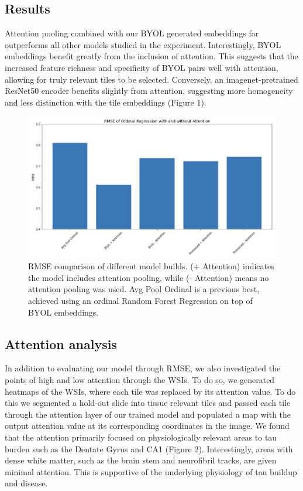 \documentclass{article} %
\begin{document}
\subsection{Results}

Attention pooling combined with our BYOL generated embeddings far outperforms all other models studied in the experiment. Interestingly, BYOL embeddings benefit greatly from the inclusion of attention. This suggests that the increased feature richness and specificity of BYOL pairs well with attention, allowing for truly relevant tiles to be selected. Conversely, an imagenet-pretrained ResNet50 encoder benefits slightly from attention, suggesting more homogeneity and less distinction with the tile embeddings (Figure 1).

\begin{figure}[h]
\begin{center}
\includegraphics[scale=0.45]{acc_figure.png}
\end{center}
\caption{RMSE comparison of different model builds. (+ Attention) indicates the model includes attention pooling,
while (- Attention) means no attention pooling was used. Avg Pool Ordinal is a previous best, achieved using an ordinal Random Forest Regression on top of BYOL embeddings.}
\end{figure}

\subsection{Attention analysis}
In addition to evaluating our model through RMSE, we also investigated the points of high and low attention through the WSIs. To do so, we generated heatmaps of the WSIs, where each tile was replaced by its attention value. To do this we segmented a hold-out slide into tissue relevant tiles and passed each tile through the attention layer of our trained model and populated a map with the output attention value at its corresponding coordinates in the image. We found that the attention primarily focused on physiologically relevant areas to tau burden such as the Dentate Gyrus and CA1 (Figure 2). Interestingly, areas with dense white matter, such as the brain stem and neurofibril tracks, are given minimal attention. This is supportive of the underlying physiology of tau buildup and disease. 
\end{document}
